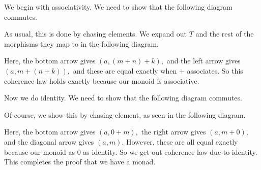 We begin with associativity. We need to show that the following diagram commutes.
\begin{center}
\end{center}
As usual, this is done by chasing elements. We expand out $T$ and the rest of the morphisms they map to in the following diagram.
\begin{center}
\end{center}
Here, the bottom arrow gives $(a,(m+n)+k),$ and the left arrow gives $(a,m+(n+k)),$ and these are equal exactly when $+$ associates. So this coherence law holds exactly because our monoid is associative.

Now we do identity. We need to show that the following diagram commutes.
\begin{center}
\end{center}
Of course, we show this by chasing element, as seen in the following diagram.
\begin{center}
\end{center}
Here, the bottom arrow gives $(a,0+m),$ the right arrow gives $(a,m+0),$ and the diagonal arrow gives $(a,m).$ However, these are all equal exactly because our monoid as $0$ as identity. So we get out coherence law due to identity. This completes the proof that we have a monad.



